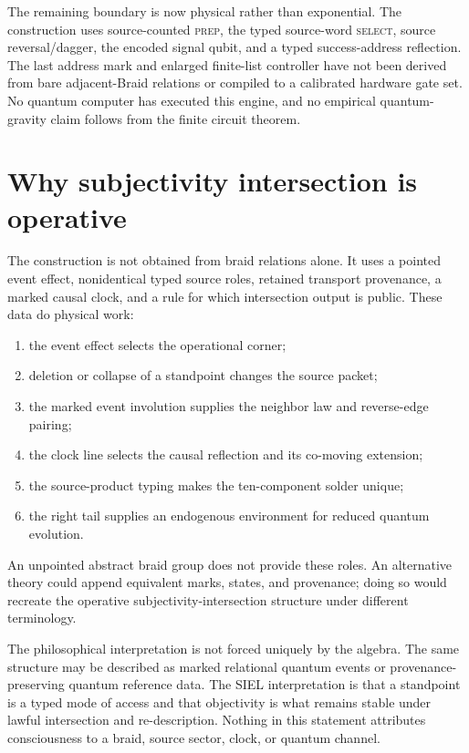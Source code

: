 \documentclass[11pt]{article}
\theoremstyle{definition}
\theoremstyle{remark}
\begin{document}
The remaining boundary is now physical rather than exponential. The construction uses source-counted \textsc{prep}, the typed source-word \textsc{select}, source reversal/dagger, the encoded signal qubit, and a typed success-address reflection. The last address mark and enlarged finite-list controller have not been derived from bare adjacent-Braid relations or compiled to a calibrated hardware gate set. No quantum computer has executed this engine, and no empirical quantum-gravity claim follows from the finite circuit theorem.

\section{Why subjectivity intersection is operative}

The construction is not obtained from braid relations alone. It uses a pointed event effect, nonidentical typed source roles, retained transport provenance, a marked causal clock, and a rule for which intersection output is public. These data do physical work:
\begin{enumerate}
\item the event effect selects the operational corner;
\item deletion or collapse of a standpoint changes the source packet;
\item the marked event involution supplies the neighbor law and reverse-edge pairing;
\item the clock line selects the causal reflection and its co-moving extension;
\item the source-product typing makes the ten-component solder unique;
\item the right tail supplies an endogenous environment for reduced quantum evolution.
\end{enumerate}
An unpointed abstract braid group does not provide these roles. An alternative theory could append equivalent marks, states, and provenance; doing so would recreate the operative subjectivity-intersection structure under different terminology.

The philosophical interpretation is not forced uniquely by the algebra. The same structure may be described as marked relational quantum events or provenance-preserving quantum reference data. The SIEL interpretation is that a standpoint is a typed mode of access and that objectivity is what remains stable under lawful intersection and re-description. Nothing in this statement attributes consciousness to a braid, source sector, clock, or quantum channel.
\end{document}
